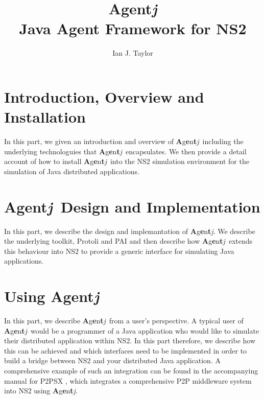 \documentclass[12pt,a4paper]{book}
\begin{document}
\newcommand{\agentj}{\textbf{A}g\textbf{e}n\textbf{t}\emph{j}}

\author{Ian J. Taylor}
\title{\agentj \\
{\small Java Agent Framework for NS2}}
\maketitle

\frontmatter%

\tableofcontents

\mainmatter


\part{Introduction, Overview and Installation}

In this part, we given an introduction and overview of \agentj~including the underlying technologuies that \agentj~encapsulates.  We then provide a detail account of how to install \agentj~into the NS2 simulation environment for the simulation of Java distributed applications.




\part{\agentj~Design and Implementation}

In this part, we describe the design and implemantation of \agentj. We describe the underlying toolkit, Protoli and PAI and then describe how \agentj~extends this behaviour into NS2 to provide a generic interface for simulating Java applications.
 




\part{Using \agentj}

In this part, we describe \agentj~from a user's perspective.  A typical user of \agentj~would be a programmer of a Java application who would like to simulate their distributed application within NS2.  In this part therefore, we describe how this can be achieved 
and which interfaces need to be implemented in order to build a bridge between NS2 and your distributed Java application.  A comprehensive example of such an integration can be found in the accompanying manual for P2PSX \cite{p2psx}, which integrates a comprehensive P2P middleware system into NS2 using \agentj. 




\backmatter%


\printindex

\end{document}
